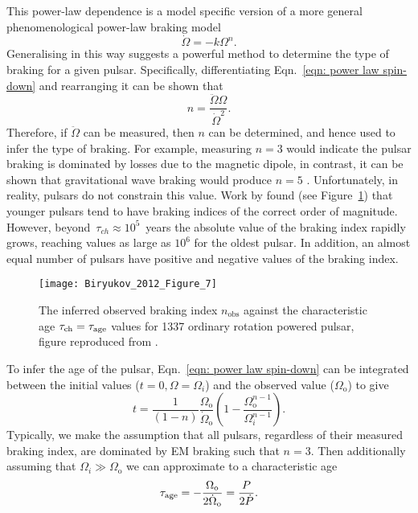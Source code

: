 This power-law dependence is a model specific version of a more general
phenomenological power-law braking model
\begin{equation}
    \dot{\Omega} = -k \Omega^{n}.
    \label{eqn: power law spin-down}
\end{equation}
Generalising in this way suggests a powerful method to determine the type of
braking for a given pulsar. Specifically, differentiating Eqn.~\eqref{eqn: power law spin-down}
and rearranging it can be shown that
\begin{equation}
    n = \frac{\ddot{\Omega}\Omega}{\dot{\Omega}^{2}}.
    \label{eqn: measured braking index}
\end{equation}
Therefore, if $\ddot{\Omega}$ can be measured, then $n$ can be determined, and
hence used to infer the type of braking. For example, measuring $n=3$ would
indicate the pulsar braking is dominated by losses due to the magnetic dipole,
in contrast, it can be shown that gravitational wave braking would produce
$n=5$ \citep{Shapiro83}. Unfortunately, in reality, pulsars do not constrain this
value. Work by \citet{Biryukov2012} found (see Figure~\ref{fig: biryukov}) that
younger pulsars tend to have braking indices of the correct order of
magnitude. However, beyond~$\tau_{ch}\approx10^{5}$~years
the absolute value of the braking index rapidly grows,
reaching values as large as $10^{6}$ for the oldest pulsar. In addition, an
almost equal number of pulsars have positive and negative values of the braking
index.
\begin{figure}[htb]
\centering
\texttt{[image: Biryukov\_2012\_Figure\_7]}
\caption{The inferred observed braking index $n_{\textrm{obs}}$ against the
characteristic age $\tau_{\textrm{ch}}=\tau_{\mathrm{age}}$ values for 1337 ordinary
rotation powered pulsar, figure reproduced from \citet{Biryukov2012}.}
\label{fig: biryukov}
\end{figure}

To infer the age of the pulsar, Eqn.~\eqref{eqn: power law spin-down} can
be integrated between the initial values ($t=0, \Omega=\Omega_{i}$) and the
observed value ($\Omega_{\mathrm{o}}$) to give
\begin{equation}
    t = \frac{1}{(1-n)} \frac{\Omega_{\mathrm{o}}}{\dot\Omega_{\mathrm{o}}} 
        \left(1 - \frac{\Omega_{\mathrm{o}}^{n-1}}{\Omega_{i}^{n-1}}\right).
\label{eqn: characteristic age}
\end{equation}
Typically, we make the assumption that all
pulsars, regardless of their measured braking index, are dominated by EM braking
such that $n=3$. Then additionally assuming that $\Omega_{i} \gg
\Omega_{\mathrm{o}}$ we can approximate to a characteristic age
\begin{equation}
    \tau_{\mathrm{age}} = -\frac{\Omega_{\mathrm{o}}}{2\dot\Omega_{\mathrm{o}}}
         = \frac{P}{2\dot{P}}.
\label{eqn: tauAge definition}
\end{equation}

